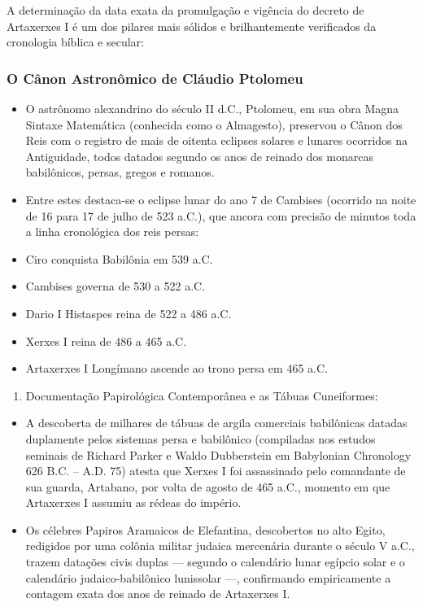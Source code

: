 A determinação da data exata da promulgação e vigência do decreto de Artaxerxes I é um dos pilares mais sólidos e brilhantemente verificados da cronologia bíblica e secular:


\subsubsection*{O Cânon Astronômico de Cláudio Ptolomeu}
\begin{itemize}
  \item O astrônomo alexandrino do século II d.C., Ptolomeu, em sua obra Magna Sintaxe Matemática (conhecida como o Almagesto), preservou o Cânon dos Reis com o registro de mais de oitenta eclipses solares e lunares ocorridos na Antiguidade, todos datados segundo os anos de reinado dos monarcas babilônicos, persas, gregos e romanos.
  \item Entre estes destaca-se o eclipse lunar do ano 7 de Cambises (ocorrido na noite de 16 para 17 de julho de 523 a.C.), que ancora com precisão de minutos toda a linha cronológica dos reis persas:
  \item Ciro conquista Babilônia em 539 a.C.
  \item Cambises governa de 530 a 522 a.C.
  \item Dario I Histaspes reina de 522 a 486 a.C.
  \item Xerxes I reina de 486 a 465 a.C.
  \item Artaxerxes I Longímano ascende ao trono persa em 465 a.C.
\end{itemize}


\begin{enumerate}
  \item Documentação Papirológica Contemporânea e as Tábuas Cuneiformes:
\end{enumerate}

\begin{itemize}
  \item A descoberta de milhares de tábuas de argila comerciais babilônicas datadas duplamente pelos sistemas persa e babilônico (compiladas nos estudos seminais de Richard Parker e Waldo Dubberstein em Babylonian Chronology 626 B.C. – A.D. 75) atesta que Xerxes I foi assassinado pelo comandante de sua guarda, Artabano, por volta de agosto de 465 a.C., momento em que Artaxerxes I assumiu as rédeas do império.
  \item Os célebres Papiros Aramaicos de Elefantina, descobertos no alto Egito, redigidos por uma colônia militar judaica mercenária durante o século V a.C., trazem datações civis duplas — segundo o calendário lunar egípcio solar e o calendário judaico-babilônico lunissolar —, confirmando empiricamente a contagem exata dos anos de reinado de Artaxerxes I.
\end{itemize}


